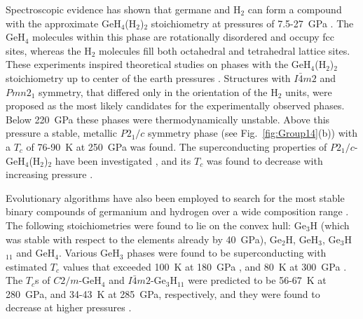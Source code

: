 \documentclass[12pt,letterpaper,oneside]{article}
\begin{document}
Spectroscopic evidence has shown that germane and H$_2$ can form a compound with the approximate GeH$_4$(H$_2$)$_2$ stoichiometry  at pressures of 7.5-27~GPa \cite{Strobel:2010-Ge}. The GeH$_4$ molecules within this phase are rotationally disordered and occupy fcc sites, whereas the H$_2$ molecules fill both octahedral and tetrahedral lattice sites. These experiments inspired theoretical studies on phases with the GeH$_4$(H$_2$)$_2$ stoichiometry up to center of the earth pressures \cite{Zhong:2012-Ge}. Structures with $I\bar{4}m2$ and $Pmn2_1$ symmetry, that differed only in the orientation of the H$_2$ units, were proposed as the most likely candidates for the experimentally observed phases. Below 220~GPa these phases were thermodynamically unstable. Above this pressure a stable, metallic $P2_1/c$ symmetry phase (see Fig.\ \ref{fig:Group14}(b)) with a $T_c$ of 76-90~K at 250~GPa was found. The superconducting properties of $P2_1/c$-GeH$_4$(H$_2$)$_2$ have been investigated \cite{Szcze:2014-Ge}, and its $T_c$ was found to decrease with increasing pressure \cite{Zhong:2013-Ge}. 

Evolutionary algorithms have also been employed to search for the most stable binary compounds of germanium and hydrogen over a wide composition range \cite{Hou:2015-Ge,Esfahani:2017-Ge}. The following stoichiometries were found to lie on the convex hull: Ge$_3$H (which was stable with respect to the elements already by 40~GPa), Ge$_2$H, GeH$_3$, Ge$_3$H$_{11}$ and GeH$_4$. Various GeH$_3$ phases were found to be superconducting with estimated $T_c$ values that exceeded 100~K at 180~GPa  \cite{Abe:2013-Ge}, and  80~K at 300~GPa \cite{Hou:2015-Ge}. The $T_c$s of $C2/m$-GeH$_4$ and $I\bar{4}m2$-Ge$_3$H$_{11}$ were predicted to be 56-67~K at 280~GPa, and 34-43~K at 285~GPa, respectively, and they were found to decrease at higher pressures \cite{Esfahani:2017-Ge}.  \\
\end{document}
